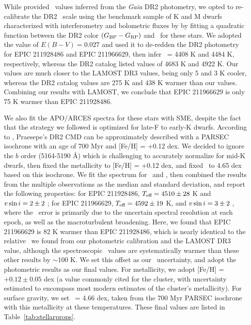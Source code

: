 While \citet{DR2prop} provided \teff\ values inferred from the 
\textit{Gaia} DR2 photometry, 
we opted to re-calibrate the DR2 \teff\ scale
using the benchmark sample of K and M dwarfs 
characterized with interferometry and 
bolometric fluxes by \citet{boyajian2012} by 
fitting a quadratic function between 
the DR2 color $(G_{\rm BP} - G_{\rm RP})$ and \teff\ for these stars.
We adopted the \citet{Taylor2006} value of 
$E(B-V) = 0.027$ and used it to de-redden the DR2 photometry for EPIC 211928486 and EPIC 211966629, 
then infer \teff\ = 4408 K and 4484 K, respectively, 
whereas the DR2 catalog listed values of 4683 K and 4922 K.
Our values are much closer to the LAMOST DR3 values, 
being only 5 and 3 K cooler, 
whereas the DR2 catalog values are 
275 K and 438 K warmer than our values. 
Combining our results with LAMOST, 
we conclude that 
EPIC 211966629 is only 75 K warmer than EPIC 211928486. 

We also fit the APO/ARCES spectra for these stars with SME, 
despite the fact that the \citet{Valenti2005} strategy we followed 
is optimized for late-F to early-K dwarfs.
According to \citet{DR2HRD}, 
Praesepe's DR2 CMD can be approximately described with a PARSEC isochrone \citep{parsec, Marigo2017}
with an age of 700 Myr and [Fe/H] = +0.12 dex. 
We decided to ignore the  $b$ order (5164-5190 \AA) which is 
challenging to accurately normalize for mid-K dwarfs, 
then fixed the metallicity to [Fe/H] = +0.12 dex,
and fixed \logg\ to 4.65 dex based on this isochrone.
We fit the spectrum for \teff\ and \vsini, 
then combined the results from the multiple observations 
as the median and standard deviation, and report the following properties:
for EPIC 211928486,
$T_{\mbox{\scriptsize eff}} = 4510 \pm 28$ K and 
$v \sin i = 2 \pm 2$ \kms; 
for EPIC 211966629, 
$T_{\mbox{\scriptsize eff}} = 4592 \pm 19$ K, and 
$v \sin i = 3 \pm 2$ \kms,
where the \vsini\ error is primarily due 
to the uncertain spectral resolution at each epoch, 
as well as the macroturbulent broadening.
Here, we found that 
EPIC 211966629 is 82 K warmer than EPIC 211928486, 
which is nearly identical to the relative \teff\ 
we found from our photometric calibration and the LAMOST DR3 value, 
although the spectroscopic \teff\ values are systematically warmer 
than these other results by $\sim$100 K.
We set this offset as our \teff\ uncertainty, 
and adopt the photometric results as our final values.
For metallicity, 
we adopt [Fe/H] = $+0.12 \pm 0.05$ dex (a value commonly cited for the cluster, with uncertainty estimated to encompass most modern 
estimates of the cluster's metallicity).
For surface gravity, we set 
\logg\ = 4.66 dex,
taken from the 700 Myr PARSEC isochrone
with this metallicity at these temperatures.
These final values are listed in Table~\ref{tab:stellarprops}.

